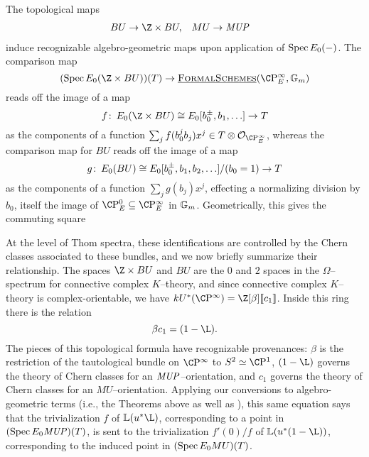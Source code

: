 \begin{remark}\label{BUtoBUZ}
The topological maps
\begin{align*}
BU & \to \Z \times BU, &
MU & \to \MUP
\end{align*}
induce recognizable algebro-geometric maps upon application of \(\operatorname{Spec} E_0(-)\).  The comparison map \[(\Spec E_0(\Z \times BU))(T) \to \InternalHom{FormalSchemes}(\CP^\infty_E, \Gm)\] reads off the image of a map \[f\co E_0(\Z \times BU) \cong E_0[b_0^\pm, b_1, \ldots] \to T\] as the components of a function \(\sum_j f(b_0^j b_j) x^j \in T \otimes \sheaf O_{\CP^\infty_E}\), whereas the comparison map for \(BU\) reads off the image of a map \[g\colon\thinspace E_0(BU) \cong E_0[b_0^\pm, b_1, b_2, \ldots] / (b_0 = 1) \to T\] as the components of a function \(\sum_j g(b_j)x^j\), effecting a normalizing division by \(b_0\), itself the image of \(\CP^0_E \subseteq \CP^\infty_E\) in \(\mathbb G_m\).  Geometrically, this gives the commuting square
\begin{center}
\end{center}

At the level of Thom spectra, these identifications are controlled by the Chern classes associated to these bundles, and we now briefly summarize their relationship.  The spaces \(\Z \times BU\) and \(BU\) are the \(0\){\th} and \(2\){\nd} spaces in the \(\Omega\)--spectrum for connective complex \(K\)--theory, and since connective complex \(K\)--theory is complex-orientable, we have \(kU^*(\CP^\infty) = \Z[\beta]\ps{c_1}\).  Inside this ring there is the relation \[\beta c_1 = (1 - \L).\]  The pieces of this topological formula have recognizable provenances: \(\beta\) is the restriction of the tautological bundle on \(\CP^\infty\) to \(S^2 \simeq \CP^1\), \((1 - \L)\) governs the theory of Chern classes for an \(\mathit{MUP}\)--orientation, and \(c_1\) governs the theory of Chern classes for an \(MU\)--orientation.  Applying our conversions to algebro-geometric terms (i.e., the Theorems above as well as ), this same equation says that the trivialization \(f\) of \(\ThomSheaf{u^* \L}\), corresponding to a point in \((\operatorname{Spec} E_0 \mathit{MUP})(T)\), is sent to the trivialization \(f'(0) / f\) of \(\ThomSheaf{u^*(1 - \L)}\), corresponding to the induced point in \((\operatorname{Spec} E_0 MU)(T)\).
\end{remark}


